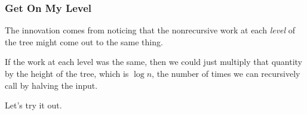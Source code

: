 \documentclass[aspectratio=169, handout]{beamer}
\begin{document}
\begin{frame}[fragile]
  \frametitle{Get On My Level}

  The innovation comes from noticing that the nonrecursive work
  at each \textit{level} of the tree might come out to the same thing.

  \pause
  \vspace{\fill}

  If the work at each level was the same, then we could just multiply
  that quantity by the height of the tree, which is $\log n$, the number 
  of times we can recursively call  by halving the input. 

  \pause
  \vspace{\fill}

  Let's try it out.
\end{frame}
\end{document}
